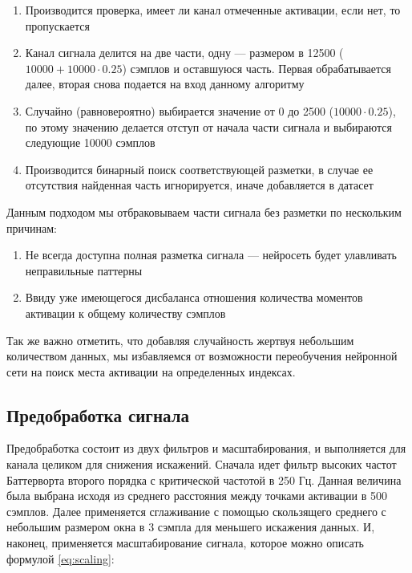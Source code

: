\begin{enumerate}
	\item Производится проверка, имеет ли канал отмеченные активации, если нет,
	то пропускается

	\item Канал сигнала делится на две части, одну --- размером в 12500 ($10000
		+ 10000 \cdot 0.25$) сэмплов и оставшуюся часть. Первая обрабатывается
	далее, вторая снова подается на вход данному алгоритму

	\item Случайно (равновероятно) выбирается значение от 0 до 2500 ($10000
		\cdot 0.25$), по этому значению делается отступ от начала части сигнала и
	выбираются следующие 10000 сэмплов

	\item Производится бинарный поиск соответствующей разметки, в случае ее
	отсутствия найденная часть игнорируется, иначе добавляется в датасет

\end{enumerate}

\noindent Данным подходом мы отбраковываем части сигнала без разметки по нескольким причинам:
\begin{enumerate}
	\item Не всегда доступна полная разметка сигнала --- нейросеть будет улавливать
	неправильные паттерны

	\item Ввиду уже имеющегося дисбаланса отношения количества моментов активации к
	общему количеству сэмплов

\end{enumerate}

Так же важно отметить, что добавляя случайность жертвуя небольшим количеством
данных, мы избавляемся от возможности переобучения нейронной сети на поиск
места активации на определенных индексах.

\subsection{Предобработка сигнала} Предобработка состоит из двух фильтров и
масштабирования, и выполняется для канала целиком для снижения искажений.
Сначала идет фильтр высоких частот Баттерворта второго порядка с критической
частотой в 250 Гц. Данная величина была выбрана исходя из среднего расстояния
между точками активации в 500 сэмплов. Далее применяется сглаживание с помощью
скользящего среднего с небольшим размером окна в 3 сэмпла для меньшего
искажения данных. И, наконец, применяется масштабирование сигнала, которое
можно описать формулой \ref{eq:scaling}:

